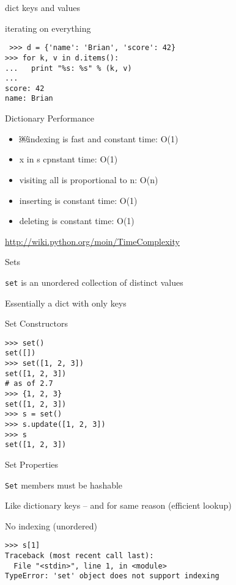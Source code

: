 \documentclass{beamer}
\begin{document}
\begin{frame}[fragile]{dict keys and values}

{\Large iterating on everything}
\vfill
\begin{verbatim}
￼>>> d = {'name': 'Brian', 'score': 42}
>>> for k, v in d.items():
...   print "%s: %s" % (k, v)
...
score: 42
name: Brian
\end{verbatim}
\vfill
\end{frame}

\begin{frame}[fragile]{Dictionary Performance }

\begin{itemize}
  \item￼indexing is fast and constant time: O(1)
  \item x in s cpnstant time: O(1)
  \item visiting all is proportional to n: O(n)
  \item inserting is constant time: O(1)
  \item deleting is constant time: O(1)
\end{itemize}

\vfill
\url{ http://wiki.python.org/moin/TimeComplexity}

\end{frame} 

\begin{frame}[fragile]{ Sets }

\vfill
{\Large \verb|set| is an unordered collection of distinct values}

\vfill
{\Large Essentially a dict with only keys}

\vfill

\end{frame} 

\begin{frame}[fragile]{Set Constructors}

\vfill
\begin{verbatim}
>>> set()
set([])
>>> set([1, 2, 3])
set([1, 2, 3])
# as of 2.7
>>> {1, 2, 3}
set([1, 2, 3])
>>> s = set()
>>> s.update([1, 2, 3])
>>> s
set([1, 2, 3])
\end{verbatim}
\vfill

\end{frame}

\begin{frame}[fragile]{ Set Properties}

\vfill
{\Large \verb|Set| members must be hashable}

\vfill
{\Large Like dictionary keys -- and for same reason (efficient lookup)}

\vfill
{\Large No indexing (unordered) }

\vfill
\begin{verbatim}
>>> s[1]
Traceback (most recent call last):
  File "<stdin>", line 1, in <module>
TypeError: 'set' object does not support indexing
\end{verbatim}

\vfill
\end{frame} 
\end{document}
